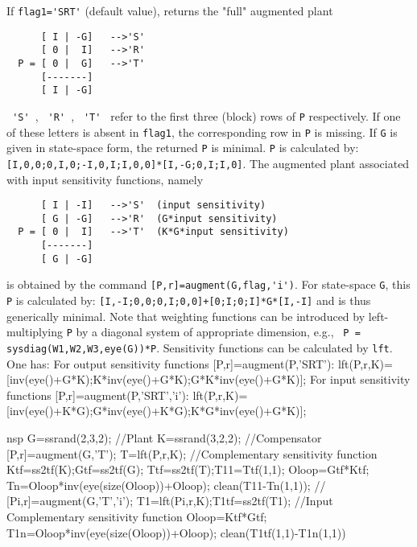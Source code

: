 \begin{mandescription}
  If \verb!flag1='SRT'! (default value), returns the "full" augmented plant
\begin{verbatim}
      [ I | -G]   -->'S'
      [ 0 |  I]   -->'R'
  P = [ 0 |  G]   -->'T'
      [-------]
      [ I | -G]
\end{verbatim}
  \verb! 'S' !, \verb! 'R' !, \verb! 'T' ! refer to the first three (block) rows
  of \verb!P! respectively.
  If one of these letters is absent in \verb!flag1!, the corresponding
  row in \verb!P! is missing.
  If \verb!G! is given in state-space form, the returned \verb!P! is minimal.
  \verb!P! is calculated by: \verb![I,0,0;0,I,0;-I,0,I;I,0,0]*[I,-G;0,I;I,0]!.
  The augmented plant associated with input sensitivity functions, namely
\begin{verbatim}
      [ I | -I]   -->'S'  (input sensitivity)
      [ G | -G]   -->'R'  (G*input sensitivity)
  P = [ 0 |  I]   -->'T'  (K*G*input sensitivity)
      [-------]
      [ G | -G]
\end{verbatim}
  is obtained by the command \verb![P,r]=augment(G,flag,'i')!. For
  state-space \verb!G!, this \verb!P!
  is calculated by: \verb![I,-I;0,0;0,I;0,0]+[0;I;0;I]*G*[I,-I]!
  and is thus generically minimal.
  Note that weighting functions can be introduced by left-multiplying
  \verb!P! by a diagonal system of appropriate dimension, e.g.,
  \verb! P = sysdiag(W1,W2,W3,eye(G))*P!.
  Sensitivity functions can be calculated by \verb!lft!. One has:
  For output sensitivity functions [P,r]=augment(P,'SRT'):
  lft(P,r,K)=[inv(eye()+G*K);K*inv(eye()+G*K);G*K*inv(eye()+G*K)];
  For input sensitivity functions [P,r]=augment(P,'SRT','i'):
  lft(P,r,K)=[inv(eye()+K*G);G*inv(eye()+K*G);K*G*inv(eye()+G*K)];
\end{mandescription}
\begin{examples}
  \begin{mintednsp}{nsp}
    G=ssrand(2,3,2); //Plant
    K=ssrand(3,2,2); //Compensator
    [P,r]=augment(G,'T');
    T=lft(P,r,K);   //Complementary sensitivity function
    Ktf=ss2tf(K);Gtf=ss2tf(G);
    Ttf=ss2tf(T);T11=Ttf(1,1);
    Oloop=Gtf*Ktf;
    Tn=Oloop*inv(eye(size(Oloop))+Oloop);
    clean(T11-Tn(1,1));
    //
    [Pi,r]=augment(G,'T','i');
    T1=lft(Pi,r,K);T1tf=ss2tf(T1); //Input Complementary sensitivity function
    Oloop=Ktf*Gtf;
    T1n=Oloop*inv(eye(size(Oloop))+Oloop);
    clean(T1tf(1,1)-T1n(1,1))
  \end{mintednsp}
\end{examples}
\begin{manseealso}
     
\end{manseealso}
